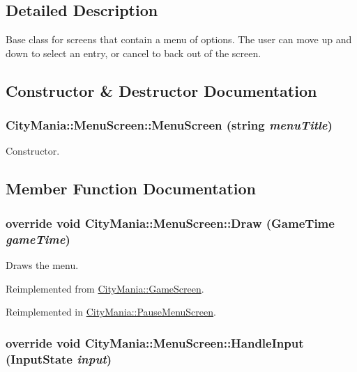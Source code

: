 \subsection{Detailed Description}
Base class for screens that contain a menu of options. The user can move up and down to select an entry, or cancel to back out of the screen. 

\subsection{Constructor \& Destructor Documentation}
\hypertarget{classCityMania_1_1MenuScreen_a21cdf9ff5eee4bc23ba30a59b297c765}{
\subsubsection[{MenuScreen}]{\setlength{\rightskip}{0pt plus 5cm}CityMania::MenuScreen::MenuScreen (string {\em menuTitle})}}
\label{classCityMania_1_1MenuScreen_a21cdf9ff5eee4bc23ba30a59b297c765}


Constructor. 

\subsection{Member Function Documentation}
\hypertarget{classCityMania_1_1MenuScreen_a433f334c09ea523b02322bd153e960d1}{
\subsubsection[{Draw}]{\setlength{\rightskip}{0pt plus 5cm}override void CityMania::MenuScreen::Draw (GameTime {\em gameTime})}}
\label{classCityMania_1_1MenuScreen_a433f334c09ea523b02322bd153e960d1}


Draws the menu. 

Reimplemented from \hyperlink{classCityMania_1_1GameScreen_a28fbcdba21da5e606d32d87b18bcdf29}{CityMania::GameScreen}.

Reimplemented in \hyperlink{classCityMania_1_1PauseMenuScreen_a1daaf1e6d3dc66500fcf020c2098a675}{CityMania::PauseMenuScreen}.\hypertarget{classCityMania_1_1MenuScreen_a9ec18d09465dd6ca3a476193bd25e0bd}{
\subsubsection[{HandleInput}]{\setlength{\rightskip}{0pt plus 5cm}override void CityMania::MenuScreen::HandleInput ({\bf InputState} {\em input})}}
\label{classCityMania_1_1MenuScreen_a9ec18d09465dd6ca3a476193bd25e0bd}


